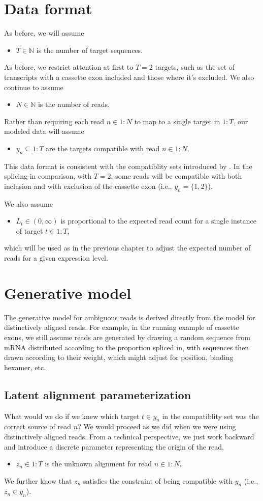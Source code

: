 \documentclass[11pt]{report}
\newcommand{\rngto}[1]{1{:}#1}
\newcommand{\anitem}[1]{\begin{itemize} \item #1 \end{itemize}}
\begin{document}
\section{Data format}

As before, we will assume
%
\anitem{$T \in \mathbb{N}$ is the number of target sequences.}
%
As before, we restrict attention at first to $T = 2$ targets, such as  
the set of transcripts with a cassette exon included and those where  
it's excluded.  We also continue to assume
%
\anitem{$N \in \mathbb{N}$ is the number of reads.}
%
Rather than requiring each read $n \in \rngto{N}$ to map to a single
target in $\rngto{T}$, our modeled data will assume
%
\anitem{$y_n \subseteq \rngto{T}$ are the targets compatible with read
  $n \in \rngto{N}$.}
%
This data format is consistent with the compatiblity sets introduced
by \cite{bray2016near}.  In the splicing-in comparison, with $T = 2$,
some reads will be compatible with both inclusion and with exclusion
of the cassette exon (i.e., $y_n = \{ 1, 2 \}$).

We also assume
%
\anitem{$L_t \in (0, \infty)$ is proportional to the expected read count for
  a single instance of target $t \in \rngto{T}$,}
%
which will be used as in the previous chapter to
adjust the expected number of reads for a given expression level.


\section{Generative model}

The generative model for ambiguous reads is derived directly from the
model for distinctively aligned reads.  For example, in the running
example of cassette exons, we still assume reads are generated by
drawing a random sequence from mRNA distributed according to the
proportion spliced in, with sequences then drawn
according to their weight, which might adjust for position, binding
hexamer, etc.

\subsection{Latent alignment parameterization}

What would we do if we knew which target $t \in y_n$ in the
compatiblity set was the correct source of read $n$?  We would
proceed as we did when we were using distinctively aligned reads.
From a technical perspective, we just work backward and introduce a
discrete parameter representing the origin of the read,
%
\anitem{$z_n \in \rngto{T}$ is the unknown alignment for read $n \in \rngto{N}$.}
%
We further know that $z_n$ satisfies the constraint of being
compatible with $y_n$ (i.e., $z_n \in y_n$).  
\end{document}

